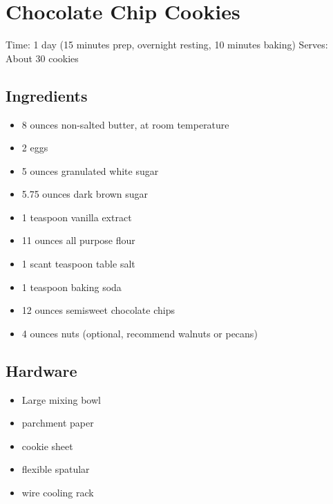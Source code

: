 \section{Chocolate Chip Cookies}
\label{chocolateChipCookies}
\setcounter{secnumdepth}{0}
Time: 1 day (15 minutes prep, overnight resting, 10 minutes baking)
Serves: About 30 cookies

\begin{multicols}{2}
\subsection*{Ingredients}
\begin{itemize}
    \item 8 ounces non-salted butter, at room temperature
    \item 2 eggs
    \item 5 ounces granulated white sugar
    \item 5.75 ounces dark brown sugar
    \item 1 teaspoon vanilla extract
    \item 11 ounces all purpose flour
    \item 1 scant teaspoon table salt
    \item 1 teaspoon baking soda
    \item 12 ounces semisweet chocolate chips
    \item 4 ounces nuts (optional, recommend walnuts or pecans)
\end{itemize}

\subsection*{Hardware}
\begin{itemize}
    \item Large mixing bowl
    \item parchment paper
    \item cookie sheet
    \item flexible spatular
    \item wire cooling rack
\end{itemize}
\clearpage


\end{multicols}
